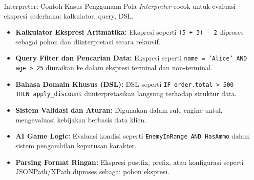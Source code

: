 \documentclass[aspectratio=169, table]{beamer}
\begin{document}
\begin{frame}{Interpreter: Contoh Kasus Penggunaan}
	\vspace{20pt}
Pola \textit{Interpreter} cocok untuk evaluasi ekspresi sederhana: kalkulator, query, DSL.
	
	\begin{itemize}
		\item \textbf{Kalkulator Ekspresi Aritmatika:} Ekspresi seperti \texttt{(5 + 3) - 2} diproses sebagai pohon dan diinterpretasi secara rekursif.
		\item \textbf{Query Filter dan Pencarian Data:} Ekspresi seperti \texttt{name = 'Alice' AND age > 25} diuraikan ke dalam ekspresi terminal dan non-terminal.
		\item \textbf{Bahasa Domain Khusus (DSL):} DSL seperti \texttt{IF order.total > 500 THEN apply\_discount} diinterpretasikan langsung terhadap struktur data.
		\item \textbf{Sistem Validasi dan Aturan:} Digunakan dalam rule engine untuk mengevaluasi kebijakan berbasis data klien.
		\item \textbf{AI Game Logic:} Evaluasi kondisi seperti \texttt{EnemyInRange AND HasAmmo} dalam sistem pengambilan keputusan karakter.
		\item \textbf{Parsing Format Ringan:} Ekspresi postfix, prefix, atau konfigurasi seperti JSONPath/XPath diproses sebagai pohon ekspresi.
	\end{itemize}

\end{frame}
\end{document}
